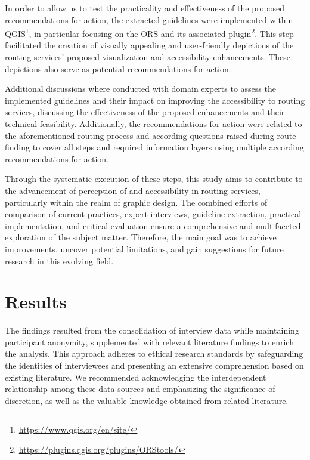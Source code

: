 \documentclass[agile, final]{copernicus-agile}
\begin{document}
In order to allow us to test the practicality and effectiveness of the proposed recommendations for action, the extracted guidelines were implemented within QGIS\footnote{\url{https://www.qgis.org/en/site/}}, in particular focusing on the ORS and its associated plugin\footnote{\url{https://plugins.qgis.org/plugins/ORStools/}}. This step facilitated the creation of visually appealing and user-friendly depictions of the routing services' proposed visualization and accessibility enhancements. These depictions also serve as potential recommendations for action.

Additional discussions where conducted with domain experts to assess the implemented guidelines and their impact on improving the accessibility to routing services, discussing the effectiveness of the proposed enhancements and their technical feasibility. Additionally, the recommendations for action were related to the aforementioned routing process and according questions raised during route finding to cover all steps and required information layers using multiple according recommendations for action. 

Through the systematic execution of these steps, this study aims to contribute to the advancement of perception of and accessibility in routing services, particularly within the realm of graphic design. The combined efforts of comparison of current practices, expert interviews, guideline extraction, practical implementation, and critical evaluation ensure a comprehensive and multifaceted exploration of the subject matter. Therefore, the main goal was to achieve improvements, uncover potential limitations, and gain suggestions for future research in this evolving field.


\section{Results}

The findings resulted from the consolidation of interview data while maintaining participant anonymity, supplemented with relevant literature findings to enrich the analysis. This approach adheres to ethical research standards by safeguarding the identities of interviewees and presenting an extensive comprehension based on existing literature. We recommended acknowledging the interdependent relationship among these data sources and emphasizing the significance of discretion, as well as the valuable knowledge obtained from related literature.
\end{document}
